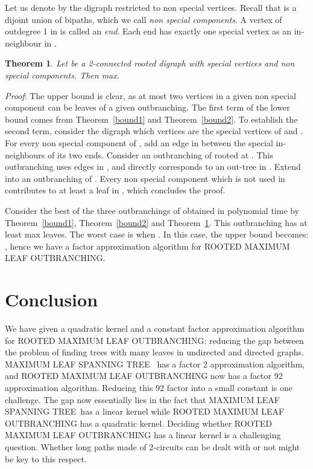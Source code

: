 \documentclass{article}
\newtheorem{theorem}{Theorem}
\def\RMO{R{\footnotesize{OOTED}} M{\footnotesize{AXIMUM}} L{\footnotesize{EAF}} O{\footnotesize{UTBRANCHING}} }
\def\RMOB{R{\footnotesize{OOTED}} M{\footnotesize{AXIMUM}} L{\footnotesize{EAF}} O{\footnotesize{UTBRANCHING}}. }
\def\RMOC{R{\footnotesize{OOTED}} M{\footnotesize{AXIMUM}} L{\footnotesize{EAF}} O{\footnotesize{UTBRANCHING}}: }
\def\ML{M{\footnotesize{AXIMUM}} L{\footnotesize{EAF}} S{\footnotesize{PANNING}} T{\footnotesize{REE}}}
\begin{document}
Let us denote by  the digraph  restricted to non special vertices. Recall that  is a dijoint union of bipaths, which we call \emph{non special components}. A vertex of outdegree 1 in  is called an \emph{end}. Each end has exactly one special vertex as an in-neighbour in .

 
\begin{theorem}\label{majbound} 
Let  be a 2-connected rooted digraph with  special vertices and  non special components. Then max.
\end{theorem}
\emph{Proof}: The upper bound is clear, as at most two vertices in a given non special component can be leaves of a given outbranching. The first term of the lower bound comes from Theorem~\ref{bound1} and Theorem~\ref{bound2}. To establish the second term, consider the digraph  which vertices are the special vertices of  and . For every non special component of , add an edge in  between the special in-neighbours of its two ends. Consider an outbranching of  rooted at . This outbranching uses  edges in , and directly corresponds to an out-tree  in . Extend  into an outbranching  of . Every non special component which is not used in  contributes to at least a leaf in , which concludes the proof.



\vspace{12pt}

Consider the best of the three outbranchings of  obtained in polynomial time by Theorem~\ref{bound1}, Theorem~\ref{bound2} and Theorem~\ref{majbound}. This outbranching has at least max leaves. The worst case is when . In this case, the upper bound becomes: , hence we have a factor  approximation algorithm for \RMOB


\section{Conclusion}
We have given a quadratic kernel and a constant factor approximation algorithm for \RMOC reducing the gap between the problem of finding trees with many leaves in undirected and directed graphs. \ML ~ has a factor 2 approximation algorithm, and \RMO now has a factor 92 approximation algorithm. Reducing this 92 factor into a small constant is one challenge. The gap now essentially lies in the fact that \ML ~has a linear kernel while \RMO has a quadratic kernel. Deciding whether \RMO has a linear kernel is a challenging question. Whether long paths made of 2-circuits can be dealt with or not might be key to this respect.





\end{document}
